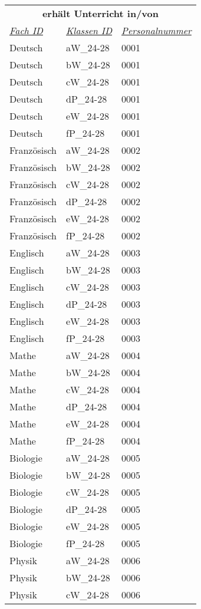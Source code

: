 \documentclass{standalone}
\begin{document}
\begin{tabular}{|l|l|l|}
    \hline
    \multicolumn{3}{c}{\cellcolor[HTML]{C0C0C0} \textbf{erhält Unterricht in/von}} \\
    \textit{\underline{Fach ID}}&
    \textit{\underline{Klassen ID}}&
    \textit{\underline{Personalnummer}} \\ \hline
    Deutsch&aW\_24-28&0001\\
    Deutsch&bW\_24-28&0001\\
    Deutsch&cW\_24-28&0001\\
    Deutsch&dP\_24-28&0001\\
    Deutsch&eW\_24-28&0001\\
    Deutsch&fP\_24-28&0001\\
    Französisch&aW\_24-28&0002\\
    Französisch&bW\_24-28&0002\\
    Französisch&cW\_24-28&0002\\
    Französisch&dP\_24-28&0002\\
    Französisch&eW\_24-28&0002\\
    Französisch&fP\_24-28&0002\\
    Englisch&aW\_24-28&0003\\
    Englisch&bW\_24-28&0003\\
    Englisch&cW\_24-28&0003\\
    Englisch&dP\_24-28&0003\\
    Englisch&eW\_24-28&0003\\
    Englisch&fP\_24-28&0003\\
    Mathe&aW\_24-28&0004\\
    Mathe&bW\_24-28&0004\\
    Mathe&cW\_24-28&0004\\
    Mathe&dP\_24-28&0004\\
    Mathe&eW\_24-28&0004\\
    Mathe&fP\_24-28&0004\\
    Biologie&aW\_24-28&0005\\
    Biologie&bW\_24-28&0005\\
    Biologie&cW\_24-28&0005\\
    Biologie&dP\_24-28&0005\\
    Biologie&eW\_24-28&0005\\
    Biologie&fP\_24-28&0005\\
    Physik&aW\_24-28&0006\\
    Physik&bW\_24-28&0006\\
    Physik&cW\_24-28&0006\\

\end{tabular}
\end{document}
